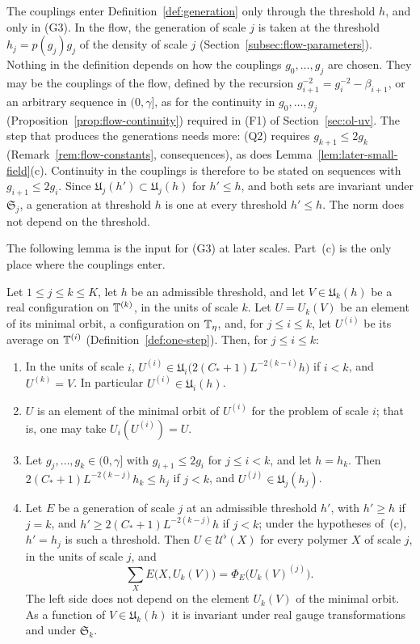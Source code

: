 \begin{remark}\label{rem:generation-couplings}
The couplings enter Definition~\ref{def:generation} only through the threshold $h$, and only in (G3). In the flow, the generation of scale $j$ is taken at the threshold $h_j=p(g_j)g_j$ of the density of scale $j$ (Section~\ref{subsec:flow-parameters}). Nothing in the definition depends on how the couplings $g_0,\dots,g_j$ are chosen. They may be the couplings of the flow, defined by the recursion $g_{i+1}^{-2}=g_i^{-2}-\beta_{i+1}$, or an arbitrary sequence in $(0,\gamma]$, as for the continuity in $g_0,\dots,g_j$ (Proposition~\ref{prop:flow-continuity}) required in (F1) of Section~\ref{sec:ol-uv}. The step that produces the generations needs more: (Q2) requires $g_{k+1}\le2g_k$ (Remark~\ref{rem:flow-constants}, consequences), as does Lemma~\ref{lem:later-small-field}(c). Continuity in the couplings is therefore to be stated on sequences with $g_{i+1}\le2g_i$. Since $\mathfrak U_j(h')\subset\mathfrak U_j(h)$ for $h'\le h$, and both sets are invariant under $\mathfrak S_j$, a generation at threshold $h$ is one at every threshold $h'\le h$. The norm does not depend on the threshold.
\end{remark}

The following lemma is the input for (G3) at later scales. Part~(c) is the only place where the couplings enter.

\begin{lemma}\label{lem:later-small-field}
Let $1\le j\le k\le K$, let $h$ be an admissible threshold, and let $V\in\mathfrak U_k(h)$ be a real configuration on $\mathbb T^{(k)}$, in the units of scale $k$. Let $U=U_k(V)$ be an element of its minimal orbit, a configuration on $\mathbb T_\eta$, and, for $j\le i\le k$, let $U^{(i)}$ be its average on $\mathbb T^{(i)}$ (Definition~\ref{def:one-step}). Then, for $j\le i\le k$:
\begin{enumerate}[label=(\alph*)]
\item In the units of scale $i$, $U^{(i)}\in\mathfrak U_i\big(2(C_*+1)L^{-2(k-i)}h\big)$ if $i<k$, and $U^{(k)}=V$. In particular $U^{(i)}\in\mathfrak U_i(h)$.
\item $U$ is an element of the minimal orbit of $U^{(i)}$ for the problem of scale $i$; that is, one may take $U_i(U^{(i)})=U$.
\item Let $g_j,\dots,g_k\in(0,\gamma]$ with $g_{i+1}\le2g_i$ for $j\le i<k$, and let $h=h_k$. Then $2(C_*+1)L^{-2(k-j)}h_k\le h_j$ if $j<k$, and $U^{(j)}\in\mathfrak U_j(h_j)$.
\item Let $E$ be a generation of scale $j$ at an admissible threshold $h'$, with $h'\ge h$ if $j=k$, and $h'\ge2(C_*+1)L^{-2(k-j)}h$ if $j<k$; under the hypotheses of~(c), $h'=h_j$ is such a threshold. Then $U\in\mathcal U^\flat(X)$ for every polymer $X$ of scale $j$, in the units of scale $j$, and
\[
\sum_XE\big(X,U_k(V)\big)=\Phi_E\big(U_k(V)^{(j)}\big).
\]
The left side does not depend on the element $U_k(V)$ of the minimal orbit. As a function of $V\in\mathfrak U_k(h)$ it is invariant under real gauge transformations and under $\mathfrak S_k$.
\end{enumerate}
\end{lemma}

